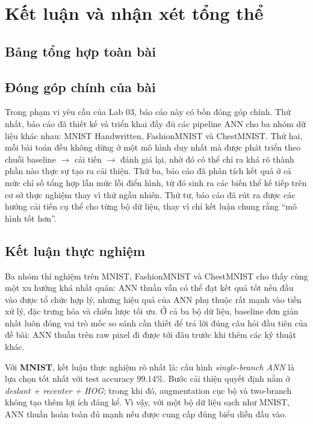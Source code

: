 \chapter{Kết luận và nhận xét tổng thể}

\section{Bảng tổng hợp toàn bài}



\section{Đóng góp chính của bài}

Trong phạm vi yêu cầu của Lab 03, báo cáo này có bốn đóng góp chính. Thứ nhất, báo cáo đã thiết kế và triển khai đầy đủ các pipeline ANN cho ba nhóm dữ liệu khác nhau: MNIST Handwritten, FashionMNIST và ChestMNIST. Thứ hai, mỗi bài toán đều không dừng ở một mô hình duy nhất mà được phát triển theo chuỗi baseline $\rightarrow$ cải tiến $\rightarrow$ đánh giá lại, nhờ đó có thể chỉ ra khá rõ thành phần nào thực sự tạo ra cải thiện. Thứ ba, báo cáo đã phân tích kết quả ở cả mức chỉ số tổng hợp lẫn mức lỗi điển hình, từ đó sinh ra các biến thể kế tiếp trên cơ sở thực nghiệm thay vì thử ngẫu nhiên. Thứ tư, báo cáo đã rút ra được các hướng cải tiến cụ thể cho từng bộ dữ liệu, thay vì chỉ kết luận chung rằng ``mô hình tốt hơn''.

\section{Kết luận thực nghiệm}

Ba nhóm thí nghiệm trên MNIST, FashionMNIST và ChestMNIST cho thấy cùng một xu hướng khá nhất quán: ANN thuần vẫn có thể đạt kết quả tốt nếu đầu vào được tổ chức hợp lý, nhưng hiệu quả của ANN phụ thuộc rất mạnh vào tiền xử lý, đặc trưng hóa và chiến lược tối ưu. Ở cả ba bộ dữ liệu, baseline đơn giản nhất luôn đóng vai trò mốc so sánh cần thiết để trả lời đúng câu hỏi đầu tiên của đề bài: ANN thuần trên raw pixel đi được tới đâu trước khi thêm các kỹ thuật khác.

Với \textbf{MNIST}, kết luận thực nghiệm rõ nhất là: cấu hình \textit{single-branch ANN} là lựa chọn tốt nhất với test accuracy $99.14\%$. Bước cải thiện quyết định nằm ở \textit{deslant + recenter + HOG}; trong khi đó, augmentation cục bộ và two-branch không tạo thêm lợi ích đáng kể. Vì vậy, với một bộ dữ liệu sạch như MNIST, ANN thuần hoàn toàn đủ mạnh nếu được cung cấp đúng biểu diễn đầu vào.

